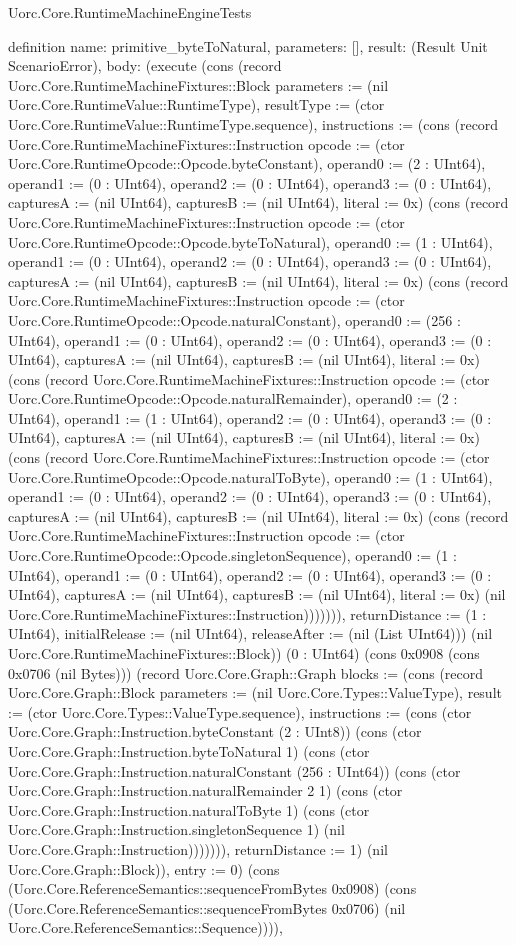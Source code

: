 \begin{lexlean}{Uorc.Core.RuntimeMachineEngineTests}
\begin{semanticmodule}
definition{
  name: primitive_byteToNatural,
  parameters: [],
  result: (Result Unit ScenarioError),
  body: (execute (cons (record Uorc.Core.RuntimeMachineFixtures::Block {parameters := (nil Uorc.Core.RuntimeValue::RuntimeType), resultType := (ctor Uorc.Core.RuntimeValue::RuntimeType.sequence), instructions := (cons (record Uorc.Core.RuntimeMachineFixtures::Instruction {opcode := (ctor Uorc.Core.RuntimeOpcode::Opcode.byteConstant), operand0 := (2 : UInt64), operand1 := (0 : UInt64), operand2 := (0 : UInt64), operand3 := (0 : UInt64), capturesA := (nil UInt64), capturesB := (nil UInt64), literal := 0x}) (cons (record Uorc.Core.RuntimeMachineFixtures::Instruction {opcode := (ctor Uorc.Core.RuntimeOpcode::Opcode.byteToNatural), operand0 := (1 : UInt64), operand1 := (0 : UInt64), operand2 := (0 : UInt64), operand3 := (0 : UInt64), capturesA := (nil UInt64), capturesB := (nil UInt64), literal := 0x}) (cons (record Uorc.Core.RuntimeMachineFixtures::Instruction {opcode := (ctor Uorc.Core.RuntimeOpcode::Opcode.naturalConstant), operand0 := (256 : UInt64), operand1 := (0 : UInt64), operand2 := (0 : UInt64), operand3 := (0 : UInt64), capturesA := (nil UInt64), capturesB := (nil UInt64), literal := 0x}) (cons (record Uorc.Core.RuntimeMachineFixtures::Instruction {opcode := (ctor Uorc.Core.RuntimeOpcode::Opcode.naturalRemainder), operand0 := (2 : UInt64), operand1 := (1 : UInt64), operand2 := (0 : UInt64), operand3 := (0 : UInt64), capturesA := (nil UInt64), capturesB := (nil UInt64), literal := 0x}) (cons (record Uorc.Core.RuntimeMachineFixtures::Instruction {opcode := (ctor Uorc.Core.RuntimeOpcode::Opcode.naturalToByte), operand0 := (1 : UInt64), operand1 := (0 : UInt64), operand2 := (0 : UInt64), operand3 := (0 : UInt64), capturesA := (nil UInt64), capturesB := (nil UInt64), literal := 0x}) (cons (record Uorc.Core.RuntimeMachineFixtures::Instruction {opcode := (ctor Uorc.Core.RuntimeOpcode::Opcode.singletonSequence), operand0 := (1 : UInt64), operand1 := (0 : UInt64), operand2 := (0 : UInt64), operand3 := (0 : UInt64), capturesA := (nil UInt64), capturesB := (nil UInt64), literal := 0x}) (nil Uorc.Core.RuntimeMachineFixtures::Instruction))))))), returnDistance := (1 : UInt64), initialRelease := (nil UInt64), releaseAfter := (nil (List UInt64))}) (nil Uorc.Core.RuntimeMachineFixtures::Block)) (0 : UInt64) (cons 0x0908 (cons 0x0706 (nil Bytes))) (record Uorc.Core.Graph::Graph {blocks := (cons (record Uorc.Core.Graph::Block {parameters := (nil Uorc.Core.Types::ValueType), result := (ctor Uorc.Core.Types::ValueType.sequence), instructions := (cons (ctor Uorc.Core.Graph::Instruction.byteConstant (2 : UInt8)) (cons (ctor Uorc.Core.Graph::Instruction.byteToNatural 1) (cons (ctor Uorc.Core.Graph::Instruction.naturalConstant (256 : UInt64)) (cons (ctor Uorc.Core.Graph::Instruction.naturalRemainder 2 1) (cons (ctor Uorc.Core.Graph::Instruction.naturalToByte 1) (cons (ctor Uorc.Core.Graph::Instruction.singletonSequence 1) (nil Uorc.Core.Graph::Instruction))))))), returnDistance := 1}) (nil Uorc.Core.Graph::Block)), entry := 0}) (cons (Uorc.Core.ReferenceSemantics::sequenceFromBytes 0x0908) (cons (Uorc.Core.ReferenceSemantics::sequenceFromBytes 0x0706) (nil Uorc.Core.ReferenceSemantics::Sequence)))),
}
\end{semanticmodule}
\end{lexlean}
